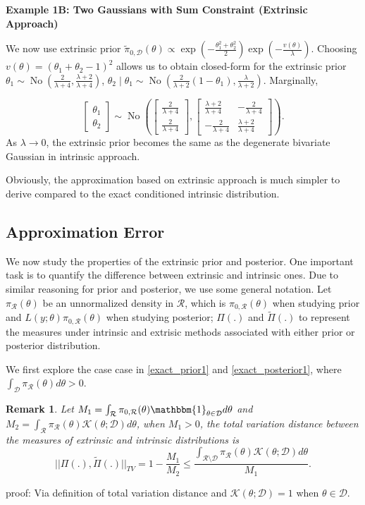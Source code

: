\documentclass[10pt]{article}
\newtheorem{remark}{Remark}
\newcommand{\mc}[1]{\mathcal{#1}}
\DeclareMathOperator{\No}{No}
\DeclareMathOperator{\1}{\mathbbm{1}}
\begin{document}
{\bf Example 1B: Two Gaussians with Sum Constraint (Extrinsic Approach)}

We now use extrinsic prior $\tilde\pi_{0,\mc D}(\theta) \propto \exp(-\frac{\theta_1^2+\theta_2^2}{2})\exp(-\frac{v(\theta)}{\lambda})$. Choosing $v(\theta)= (\theta_1+\theta_2-1)^2$ allows us to obtain closed-form for the extrinsic prior $\theta_1 \sim \No(\frac{2}{\lambda+4},\frac{\lambda+2}{\lambda+4})$, $\theta_2\mid \theta_1 \sim \No(\frac{2}{\lambda+2}(1-\theta_1),\frac{\lambda}{\lambda+2})$. Marginally, 

$$\begin{bmatrix} \theta_1 \\ \theta_2 \end{bmatrix} \sim
\No \left(
 \begin{bmatrix} \frac{2}{\lambda+4} \\ \frac{2}{\lambda+4} \end{bmatrix},
\begin{bmatrix} \frac{\lambda+2}{\lambda+4} & -\frac{2}{\lambda+4}  \\  -\frac{2}{\lambda+4}  &\frac{\lambda+2}{\lambda+4} \end{bmatrix}
\right).$$
As $\lambda\rightarrow 0$, the extrinsic prior becomes the same as the degenerate bivariate Gaussian in intrinsic approach.

Obviously, the approximation based on extrinsic approach is much simpler to derive compared to the exact conditioned intrinsic distribution.

\subsection{Approximation Error}

We now study the properties of the extrinsic prior and posterior. One important task is to quantify the difference between extrinsic and intrinsic ones. Due to similar reasoning for prior and posterior, we use some general notation. Let $\pi_{\mc R}(\theta)$ be an unnormalized density in $\mc R$, which is $\pi_{0,\mc R}(\theta)$ when studying prior and $L(y;\theta)\pi_{0,\mc R}(\theta)$ when studying posterior; $\Pi(.)$ and $\tilde\Pi(.)$ to represent the measures under intrinsic and extrisic methods associated with either prior or posterior distribution. 

We first explore the case case in \eqref{exact_prior1} and  \eqref{exact_posterior1}, where $\int_{\mc D} \pi_{\mc R}(\theta)d\theta>0$.

\begin{remark}
Let $M_1= \int_{\mc R} \pi_{0,\mc R}(\theta) \mathbbm{1}_{\theta\in \mc D} d\theta$ and $M_2 = \int_{\mc R} \pi_{\mc R}(\theta) \mc K(\theta;\mc D)d\theta$, when $M_1>0$, the total variation distance between the measures of extrinsic and intrinsic distributions is
$$||\Pi(.), \tilde{\Pi}(.) ||_{TV} = 1 - \frac{M_1}{M_2} \le \frac{\int_{\mc R \setminus \mc D} \pi_{\mc R}(\theta) \mc K(\theta;\mc D)d\theta}{M_1}.$$
\end{remark}
proof:
{Via definition of total variation distance and $\mc K(\theta;\mc D)=1$ when $\theta\in\mc D$.}
\end{document}
